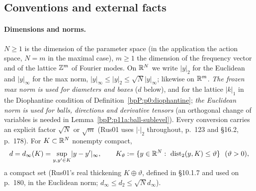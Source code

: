 \subsection{Conventions and external facts}\label{bpP:p11a:conv}

\paragraph{Dimensions and norms.} $N\ge1$ is the dimension of the parameter space (in the application the action space, $N=m$ in the maximal case), $m\ge1$ the dimension of the frequency vector and of the lattice $\mathbb{Z}^m$ of Fourier modes. On $\mathbb{R}^N$ we write $\lvert y\rvert_2$ for the Euclidean and $\lvert y\rvert_\infty$ for the max norm, $\lvert y\rvert_\infty\le\lvert y\rvert_2\le\sqrt N\lvert y\rvert_\infty$; likewise on $\mathbb{R}^m$. \emph{The frozen max norm is used for diameters and boxes} ($d$ below), and for the lattice $\lvert k\rvert_1$ in the Diophantine condition of Definition~\ref{bpP:p0:diophantine}; \emph{the Euclidean norm is used for balls, directions and derivative tensors} (an orthogonal change of variables is needed in Lemma~\ref{bpP:p11a:ball-sublevel}). Every conversion carries an explicit factor $\sqrt N$ or $\sqrt m$ (Rus01 uses $\lvert\cdot\rvert_2$ throughout, p.~123 and \S16.2, p.~178). For $K\subset\mathbb{R}^N$ nonempty compact,
\[d=d_\infty(K)=\sup_{y,y'\in K}\lvert y-y'\rvert_\infty,\qquad \Nbd\vartheta:=\{y\in\R^N:\ \operatorname{dist}_2(y,K)\le\vartheta\}\ \ (\vartheta>0),\]
a compact set (Rus01's real thickening $K\oplus\vartheta$, defined in \S10.1.7 and used on p.~180, in the Euclidean norm; $d_\infty\le d_2\le\sqrt Nd_\infty$).

